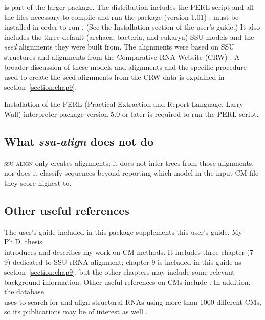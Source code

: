  is part of the larger  package. The
 distribution includes the PERL script
 and all the files necessary to compile and run
the  package (version 1.01)
\cite{Nawrocki09}.  must be installed in order to
run .  (See the Installation section of the
 user's guide.) It also includes the three default
(archaea, bacteria, and eukarya) SSU models and the \emph{seed}
alignments they were built from. The alignments were based on SSU
structures and alignments from the Comparative RNA Website (CRW)
\cite{Cannone02}. A broader discussion of these models and alignments
and the specific procedure used to create the seed alignments from the
CRW data is explained in section~\ref{section:chap9}.

Installation of the PERL (Practical Extraction and Report Language,
Larry Wall) interpreter package version 5.0 or later is required to
run the  PERL script.

\subsection{What \emph{ssu-align} does not do}

\textsc{ssu-align} only creates alignments; it does not infer trees
from those alignments, nor does it classify sequences beyond reporting
which model in the input CM file they score highest to.

\subsection{Other useful references}

The  user's guide \cite{infernalguide} included in
this package supplements this user's guide. My Ph.D. thesis 
 \\
introduces and describes my work on CM methods. It includes three chapter (7-9) dedicated to
SSU rRNA alignment; chapter 9 is included in this guide as
section~\ref{section:chap9}, but the other chapters may include some
relevant background information. 
Other useful references on CMs include
\cite{Eddy94,Eddy02b,NawrockiEddy07,Nawrocki09,KolbeEddy09}. In
addition, the  database 
\\
uses  to search for and align
structural RNAs using more than 1000 different CMs, so its
publications may be of interest as well
\cite{Griffiths-Jones03,Griffiths-Jones05,Gardner09}.

